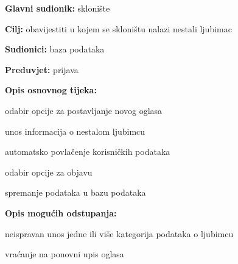 					\noindent {}
					\begin{packed_item}
						
						\item \textbf{Glavni sudionik: } sklonište
						\item  \textbf{Cilj:} obavijestiti u kojem se skloništu nalazi nestali ljubimac
						\item  \textbf{Sudionici:} baza podataka
						\item  \textbf{Preduvjet:} prijava
						\item  \textbf{Opis osnovnog tijeka:}
						
						\item[] \begin{packed_enum}
							
							\item odabir opcije za postavljanje novog oglasa
							\item unos informacija o nestalom ljubimcu
							\item automatsko povlačenje korisničkih podataka
							\item odabir opcije za objavu
							\item spremanje podataka u bazu podataka
						\end{packed_enum}
						
						\item  \textbf{Opis mogućih odstupanja:}
						
						\item[] \begin{packed_item}
							
							\item[4.a] neispravan unos jedne ili više kategorija podataka o ljubimcu
							\item[] \begin{packed_enum}
								\item  vraćanje na ponovni upis oglasa
							\end{packed_enum}
							
						\end{packed_item}
					\end{packed_item}
					

